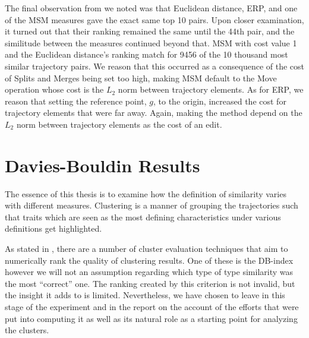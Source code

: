 
The final observation from  we noted was that Euclidean distance, ERP, and one of the MSM measures gave the exact same top 10 pairs. 
Upon closer examination, it turned out that their ranking remained the same until the 44th pair, and the similitude between the measures continued beyond that.
MSM with cost value 1 and the Euclidean distance's ranking match for 9456 of the 10 thousand most similar trajectory pairs. 
We reason that this occurred as a consequence of the cost of Splits and Merges being set too high, making MSM  default to the Move operation whose cost is the $L_2$ norm between trajectory elements.
As for ERP, we reason that setting the reference point, $g$, to the origin, increased the cost for trajectory elements that were far away.
Again, making the method depend on the $L_2$ norm between trajectory elements as the cost of an edit.


\section{Davies-Bouldin Results}

The essence of this thesis is to examine how the definition of similarity varies with different measures.
Clustering is a manner of grouping the trajectories such that traits which are seen as the most defining characteristics under various definitions get highlighted. 

As stated in , there are a number of cluster evaluation techniques that aim to numerically rank the quality of clustering results.
One of these is the DB-index however we will not an assumption regarding which type of type similarity was the most “correct” one.
The ranking created by this criterion is not invalid, but the insight it adds to is limited.
Nevertheless, we have chosen to leave in this stage of the experiment and in the report on the account of the efforts that were put into computing it as well as its natural role as a starting point for analyzing the clusters. 
 
